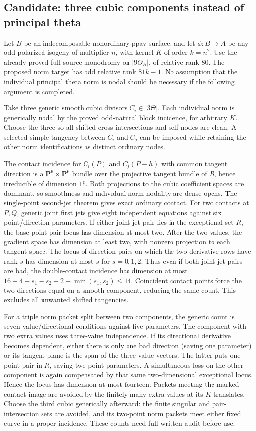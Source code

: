 \subsection*{Candidate: three cubic components instead of principal theta}
Let $B$ be an indecomposable nonordinary ppav surface, and let
$\phi:B\to A$ be any odd polarized isogeny of multiplier $n$,
with kernel $K$ of order $k=n^2$. Use the already proved full
source monodromy on $|9\Theta_B|$, of relative rank $80$.
The proposed norm target has odd relative rank $81k-1$.
No assumption that the individual principal theta norm is nodal
should be necessary if the following argument is completed.

Take three generic smooth cubic divisors $C_i\in|3\Theta|$.
Each individual norm is generically nodal by the proved odd-natural
block incidence, for arbitrary $K$. Choose the three so all shifted
cross intersections and self-nodes are clean. A selected simple
tangency between $C_i$ and $C_j$ can be imposed while retaining the
other norm identifications as distinct ordinary nodes.

The contact incidence for $C_i(P)$ and $C_j(P-h)$ with common
tangent direction is a $\mathbf P^6\times\mathbf P^6$ bundle over
the projective tangent bundle of $B$, hence irreducible of dimension
$15$. Both projections to the cubic coefficient spaces are
dominant, so smoothness and individual norm-nodality are dense opens.
The single-point second-jet theorem gives exact ordinary contact.
For two contacts at $P,Q$, generic joint first jets give eight
independent equations against six point/direction parameters.
If either joint-jet pair lies in the exceptional set $R$, the base
point-pair locus has dimension at most two. After the two values,
the gradient space has dimension at least two, with nonzero
projection to each tangent space. The locus of direction pairs
on which the two derivative rows have rank $s$ has dimension at
most $s$ for $s=0,1,2$. Thus even if both joint-jet pairs are bad,
the double-contact incidence has dimension at most
$16-4-s_1-s_2+2+\min(s_1,s_2)\le14$.
Coincident contact points force the two directions equal on a
smooth component, reducing the same count. This excludes all
unwanted shifted tangencies.

For a triple norm packet split between two components, the generic
count is seven value/directional conditions against five parameters.
The component with two extra values uses three-value independence.
If its directional derivative becomes dependent, either there is
only one bad direction (saving one parameter) or its tangent plane
is the span of the three value vectors. The latter puts one
point-pair in $R$, saving two point parameters. A simultaneous
loss on the other component is again compensated by that same
two-dimensional exceptional locus. Hence the locus has dimension
at most fourteen. Packets meeting the marked contact image are
avoided by the finitely many extra values at its $K$-translates.
Choose the third cubic generically afterward: the finite singular
and pair-intersection sets are avoided, and its two-point norm
packets meet either fixed curve in a proper incidence.
These counts need full written audit before use.

